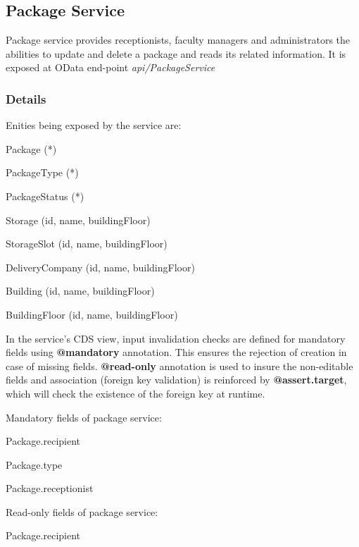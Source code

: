 \subsection{Package Service}
Package service provides receptionists, faculty managers and administrators the abilities to update and delete a package and reads its related information. It is exposed at OData end-point \textit{api/PackageService} 

\subsubsection{Details}

Enities being exposed by the service are:
\begin{compactenum}
	\item Package (*)
    \item PackageType (*)
    \item PackageStatus (*)
    \item Storage (id, name, buildingFloor)
    \item StorageSlot (id, name, buildingFloor)
    \item DeliveryCompany (id, name, buildingFloor)
    \item Building (id, name, buildingFloor)
    \item BuildingFloor (id, name, buildingFloor)
\end{compactenum}

\bigskip
In the service's CDS view, input invalidation checks are defined for mandatory fields using \textbf{@mandatory} annotation. This ensures the rejection of creation in case of missing fields. \textbf{@read-only} annotation is used to insure the non-editable fields and association (foreign key validation) is reinforced by \textbf{@assert.target}, which will check the existence of the foreign key at runtime.

\bigskip
Mandatory fields of package service:
\begin{compactenum}
	\item Package.recipient
    \item Package.type
    \item Package.receptionist
\end{compactenum}

\bigskip
Read-only fields of package service:
\begin{compactenum}
	\item Package.recipient
\end{compactenum}

